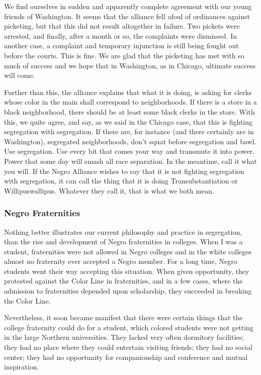 \documentclass[letterpaper,10pt,english]{jupyterBook}
\begin{document}
\sphinxAtStartPar
We find ourselves in sudden and apparently complete agreement with our young friends of Washington. It seems that the alliance fell afoul of ordinances against picketing, but that this did not result altogether in failure. Two pickets were arrested, and finally, after a month or so, the complaints were dismissed. In another case, a complaint and temporary injunction is still being fought out before the courts. This is fine. We are glad that the picketing has met with so much of success and we hope that in Washington, as in Chicago, ultimate success will come.

\sphinxAtStartPar
Further than this, the alliance explains that what it is doing, is asking for clerks whose color in the main shall correspond to neighborhoods. If there is a store in a black neighborhood, there should be at least some black clerks in the store. With this, we quite agree, and say, as we said in the Chicago case, that this is fighting segregation with segregation. If there are, for instance (and there certainly are in Washington), segregated neighborhoods, don’t squat before segregation and bawl. Use segregation. Use every bit that comes your way and transmute it into power. Power that some day will smash all race separation. In the meantime, call it what you will. If the Negro Alliance wishes to say that it is not fighting segregation with segregation, it can call the thing that it is doing Transubstantiation or Willipuswallipus. Whatever they call it, that is what we both mean.


\subsubsection{Negro Fraternities}
\label{\detokenize{Volumes/41/06/counsels_of_despair:negro-fraternities}}
\sphinxAtStartPar
Nothing better illustrates our current philosophy and practice in segregation, than the rise and development of Negro fraternities in colleges. When I was a student, fraternities were not allowed in Negro colleges and in the white colleges almost no fraternity ever accepted a Negro member. For a long time, Negro students went their way accepting this situation. When given opportunity, they protested against the Color Line in fraternities, and in a few cases, where the admission to fraternities depended upon scholarship, they succeeded in breaking the Color Line.

\sphinxAtStartPar
Nevertheless, it soon became manifest that there were certain things that the college fraternity could do for a student, which colored students were not getting in the large Northern universities. They lacked very often dormitory facilities; they had no place where they could entertain visiting friends; they had no social center; they had no opportunity for companionship and conference and mutual inspiration.
\end{document}
